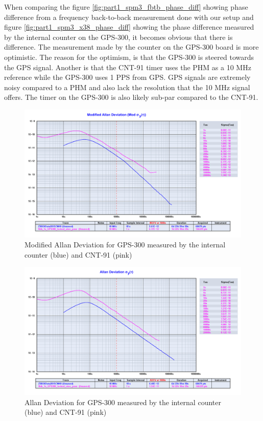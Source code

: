 \documentclass[11pt,english,a4paper]{article}
\begin{document}
When comparing the figure \ref{fig:part1_spm3_fbtb_phase_diff} showing phase difference from a frequency back-to-back  measurement done with our setup and figure \ref{fig:part1_spm3_x38_phase_diff} showing the phase difference measured by the internal counter on the GPS-300, it becomes obvious that there is difference. The measurement made by the counter on the GPS-300 board is more optimistic. The reason for the optimism, is that the GPS-300 is steered towards the GPS signal. Another is that the CNT-91 timer uses the PHM as a 10 MHz reference while the GPS-300 uses 1 PPS from GPS. GPS signals are extremely noisy compared to a PHM and also lack the resolution that the 10 MHz signal offers. The timer on the GPS-300 is also likely sub-par compared to the CNT-91. 

\begin{figure}[!htb]
  \centering
    \includegraphics[width=1\textwidth]{part1_spm4_modified_allan.png}
      \caption{Modified Allan Deviation for GPS-300 measured by the internal counter (blue) and CNT-91 (pink)}
          \label{fig:part1_spm4_modified_allan}
\end{figure}

\begin{figure}[!htb]
  \centering
    \includegraphics[width=1\textwidth]{part1_spm4_allan.png}
      \caption{Allan Deviation for GPS-300 measured by the internal counter (blue) and CNT-91 (pink)}
          \label{fig:part1_spm4_allan}
\end{figure}
\end{document}
